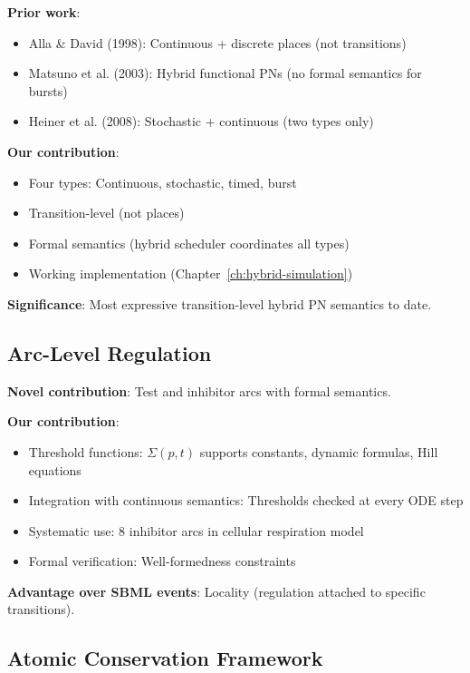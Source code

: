\textbf{Prior work}:
\begin{itemize}
    \item Alla \& David (1998): Continuous + discrete places (not transitions)
    \item Matsuno et al. (2003): Hybrid functional PNs (no formal semantics for bursts)
    \item Heiner et al. (2008): Stochastic + continuous (two types only)
\end{itemize}

\textbf{Our contribution}:
\begin{itemize}
    \item Four types: Continuous, stochastic, timed, burst
    \item Transition-level (not places)
    \item Formal semantics (hybrid scheduler coordinates all types)
    \item Working implementation (Chapter~\ref{ch:hybrid-simulation})
\end{itemize}

\textbf{Significance}: Most expressive transition-level hybrid PN semantics to date.

\subsection{Arc-Level Regulation}
\label{subsec:arc-regulation-theory}

\textbf{Novel contribution}: Test and inhibitor arcs with formal semantics.

\textbf{Our contribution}:
\begin{itemize}
    \item Threshold functions: $\Sigma(p,t)$ supports constants, dynamic formulas, Hill equations
    \item Integration with continuous semantics: Thresholds checked at every ODE step
    \item Systematic use: 8 inhibitor arcs in cellular respiration model
    \item Formal verification: Well-formedness constraints
\end{itemize}

\textbf{Advantage over SBML events}: Locality (regulation attached to specific transitions).

\subsection{Atomic Conservation Framework}
\label{subsec:atomic-conservation-theory}

